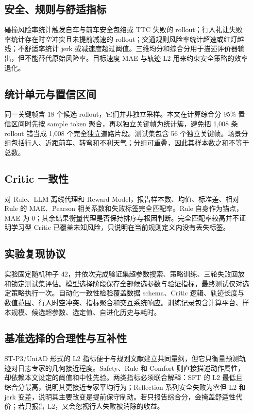 \documentclass[UTF8,a4paper,12pt,fontset=fandol]{ctexart}
\begin{document}
\subsection{安全、规则与舒适指标}
碰撞风险率统计触发自车与前车安全包络或 TTC 失败的 rollout；行人礼让失败率统计存在时空冲突且未提前减速的 rollout；交通规则风险率统计超速或红灯越线；不舒适率统计 jerk 或减速度超过阈值。三维均分和综合分用于描述评价器输出，但不能替代原始风险率。目标速度 MAE 与轨迹 L2 用来约束安全策略的效率退化。

\subsection{统计单元与置信区间}
同一关键帧含 18 个候选 rollout，它们并非独立采样。本文在计算综合分 95\% 置信区间时先按 sample token 聚合，再以独立关键帧为统计簇，避免把 1,008 条 rollout 错当成 1,008 个完全独立道路片段。测试集包含 56 个独立关键帧。场景分组包括行人、近距前车、转弯和不利天气；分组可重叠，因此其样本数之和不等于总数。

\subsection{Critic 一致性}
对 Rule、LLM 离线代理和 Reward Model，报告样本数、均值、标准差、相对 Rule 的 MAE、Pearson 相关系数和失败标签完全匹配率。Rule 自身作为锚点，MAE 为 0；其余结果衡量代理是否保持排序与根因判断。完全匹配率较高并不证明学习型 Critic 已覆盖未知风险，只说明在当前规则定义内没有丢失标签。

\subsection{实验复现协议}
实验固定随机种子 42，并依次完成验证集超参数搜索、策略训练、三轮失败回放和锁定测试集评估。模型选择阶段保存全部候选参数与验证指标，最终测试仅对选定策略执行一次。自动化一致性检验覆盖数据 schema、Critic 逻辑、轨迹长度与数值范围、行人时空冲突、指标聚合和交互系统响应。训练记录包含计算平台、样本规模、候选超参数、选定值、自进化历史与耗时。

\subsection{基准选择的合理性与互补性}
ST-P3/UniAD 形式的 L2 指标便于与规划文献建立共同量纲，但它只衡量预测轨迹对日志专家的几何接近程度。Safety、Rule 和 Comfort 则直接描述动作属性，却依赖本文设定的阈值和中性先验。两类指标必须联合解释：SFT 的 L2 最低且综合分最高，说明其更接近专家平均行为；Reflection 系列安全失败为零但 L2 和 jerk 变差，说明其主要改变是提前保守制动。若只报告综合分，会掩盖舒适性代价；若只报告 L2，又会忽视行人失败被消除的收益。
\end{document}
